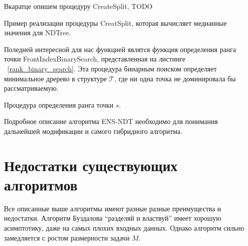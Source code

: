 Вкаратце опишем процедуру CreateSplit, TODO 

\begin{algorithm}
\begin{algorithmic}[1]
    \EndIf
\EndProcedure
\end{algorithmic}
\caption{Пример реализации процедуры CreatSplit, которая вычисляет медианные значения для NDTree.}
\label{create_split}
\end{algorithm}

Поледней интересной для нас функцией являтся функция определения ранга точки FrontIndexBinarySearch, представленная на листинге ~\ref{rank_binary_search}. Эта процедура бинарным поиском определяет минимальное дререво в структуре $\mathcal{T}$, где ни одна точка не доминировала бы рассматриваемую. 

\begin{algorithm}
\begin{algorithmic}[1]
        \Else
        \EndIf    
    \EndWhile
\EndProcedure
\end{algorithmic}
\caption{Процедура определения ранга точки $s$.}
\label{rank_binary_search}
\end{algorithm}

Подробное описание алгоритма ENS-NDT необходимо для понимания дальнейшей модификации и самого гибридного алгоритма.

\section{Недостатки существующих алгоритмов}

Все описанные выше алгоритмы имеют разные разные преимущества и недостатки. Алгоритм Буздалова ``разделяй и властвуй'' имеет хорошую асимптотику, даже на самых плохих входных данных. Однако алгоритм сильно замедляется с ростом размерности задачи $M$. 

